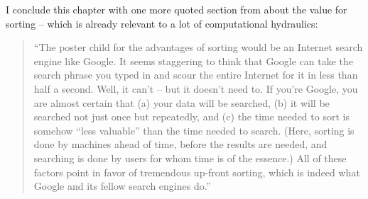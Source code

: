 I conclude this chapter with one more quoted section from \cite{Christian2016} about the value for sorting -- which is already relevant to a lot of computational hydraulics:
\begin{quote}
``The poster child for the advantages of sorting would be an Internet search engine like Google. It seems staggering to think that Google can take the search phrase you typed in and scour the entire Internet for it in less than half a second. Well, it can't -- but it doesn't need to. If you're Google, you are almost certain that (a) your data will be searched, (b) it will be searched not just once but repeatedly, and (c) the time needed to sort is somehow ``less valuable'' than the time needed to search. (Here, sorting is done by machines ahead of time, before the results are needed, and searching is done by users for whom time is of the essence.) All of these factors point in favor of tremendous up-front sorting, which is indeed what Google and its fellow search engines do.''
\end{quote}





